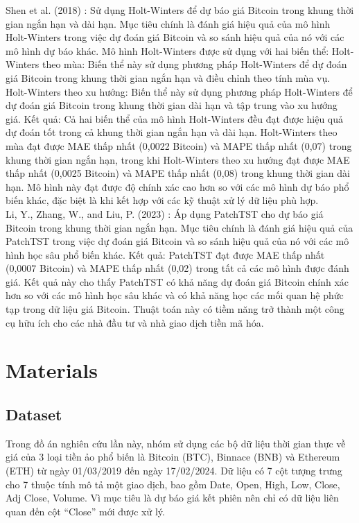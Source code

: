 \documentclass{ieeeojies}
\begin{document}
Shen et al. (2018) \cite{b11}: Sử dụng Holt-Winters để dự báo giá Bitcoin trong khung thời gian ngắn hạn và dài hạn. Mục tiêu chính là đánh giá hiệu quả của mô hình Holt-Winters trong việc dự đoán giá Bitcoin và so sánh hiệu quả của nó với các mô hình dự báo khác. Mô hình Holt-Winters được sử dụng với hai biến thể: Holt-Winters theo mùa: Biến thể này sử dụng phương pháp Holt-Winters để dự đoán giá Bitcoin trong khung thời gian ngắn hạn và điều chỉnh theo tính mùa vụ. Holt-Winters theo xu hướng: Biến thể này sử dụng phương pháp Holt-Winters để dự đoán giá Bitcoin trong khung thời gian dài hạn và tập trung vào xu hướng giá. Kết quả: Cả hai biến thể của mô hình Holt-Winters đều đạt được hiệu quả dự đoán tốt trong cả khung thời gian ngắn hạn và dài hạn. Holt-Winters theo mùa đạt được MAE thấp nhất (0,0022 Bitcoin) và MAPE thấp nhất (0,07) trong khung thời gian ngắn hạn, trong khi Holt-Winters theo xu hướng đạt được MAE thấp nhất (0,0025 Bitcoin) và MAPE thấp nhất (0,08) trong khung thời gian dài hạn. Mô hình này đạt được độ chính xác cao hơn so với các mô hình dự báo phổ biến khác, đặc biệt là khi kết hợp với các kỹ thuật xử lý dữ liệu phù hợp. \\

Li, Y., Zhang, W., and Liu, P. (2023) \cite{b12}: Áp dụng PatchTST cho dự báo giá Bitcoin trong khung thời gian ngắn hạn. Mục tiêu chính là đánh giá hiệu quả của PatchTST trong việc dự đoán giá Bitcoin và so sánh hiệu quả của nó với các mô hình học sâu phổ biến khác. Kết quả: PatchTST đạt được MAE thấp nhất (0,0007 Bitcoin) và MAPE thấp nhất (0,02) trong tất cả các mô hình được đánh giá. Kết quả này cho thấy PatchTST có khả năng dự đoán giá Bitcoin chính xác hơn so với các mô hình học sâu khác và có khả năng học các mối quan hệ phức tạp trong dữ liệu giá Bitcoin. Thuật toán này có tiềm năng trở thành một công cụ hữu ích cho các nhà đầu tư và nhà giao dịch tiền mã hóa.


\section{Materials}
\subsection{Dataset}

Trong đồ án nghiên cứu lần này, nhóm sử dụng các bộ dữ liệu thời gian thực về giá của 3 loại tiền ảo phổ biến là Bitcoin (BTC), Binnace (BNB) và Ethereum (ETH) từ ngày 01/03/2019 đến ngày 17/02/2024. Dữ liệu có 7 cột tượng trưng cho 7 thuộc tính mô tả một giao dịch, bao gồm Date, Open, High, Low, Close, Adj Close, Volume. Vì mục tiêu là dự báo giá kết phiên nên chỉ có dữ liệu liên quan đến cột “Close” mới được xử lý.
\end{document}
